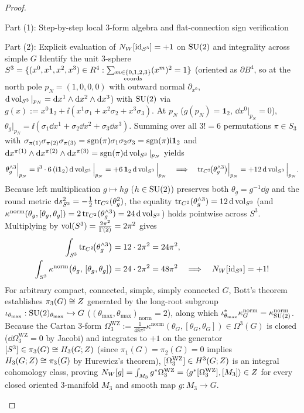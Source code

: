 \begin{proof}
\begin{proofpart}{Part (1): Step-by-step local $3$-form algebra and flat-connection sign verification}
\end{proofpart}
\begin{proofpart}{Part (2): Explicit evaluation of $N_W[\operatorname{id}_{S^3}] = +1$ on $\operatorname{SU}(2)$ and integrality across simple $G$}
Identify the unit $3$-sphere $S^3 = \{(x^0,x^1,x^2,x^3) \in R^4 : \sum_{\substack{m\in\{0,1,2,3\}\\\mathrm{coords}}}(x^m)^2 = 1\}$ (oriented as $\partial B^4$, so at the north pole $p_N = (1,0,0,0)$ with outward normal $\partial_{x^0}$, $\mathrm{d}\operatorname{vol}_{S^3}|_{p_N} = \mathrm{d} x^1\wedge\mathrm{d} x^2\wedge\mathrm{d} x^3$) with $\operatorname{SU}(2)$ via $g(x) := x^0\mathbf{1}_2 + \ii(x^1\sigma_1 + x^2\sigma_2 + x^3\sigma_3)$. At $p_N$ ($g(p_N)=\mathbf{1}_2$, $\dd x^0|_{p_N}=0$), $\theta_g|_{p_N} = \ii(\sigma_1\dd x^1 + \sigma_2\dd x^2 + \sigma_3\dd x^3)$. Summing over all $3! = 6$ permutations $\pi \in S_3$ with $\sigma_{\pi(1)}\sigma_{\pi(2)}\sigma_{\pi(3)} = \operatorname{sgn}(\pi)\sigma_1\sigma_2\sigma_3 = \operatorname{sgn}(\pi)\mathrm{i}\mathbf{1}_2$ and $\mathrm{d} x^{\pi(1)}\wedge\mathrm{d} x^{\pi(2)}\wedge\mathrm{d} x^{\pi(3)} = \operatorname{sgn}(\pi)\mathrm{d}\operatorname{vol}_{S^3}|_{p_N}$ yields
\[
\theta_g^{\wedge 3}\Big|_{p_N} = \mathrm{i}^3\cdot 6\,(\mathrm{i}\mathbf{1}_2)\,\mathrm{d}\operatorname{vol}_{S^3}\Big|_{p_N} = +6\,\mathbf{1}_2\,\mathrm{d}\operatorname{vol}_{S^3}\Big|_{p_N}\quad\Longrightarrow\quad
\operatorname{tr}_{C^2}\!\bigl(\theta_g^{\wedge 3}\bigr)\Big|_{p_N} = +12\,\mathrm{d}\operatorname{vol}_{S^3}\Big|_{p_N}.
\]
Because left multiplication $g \mapsto h g$ ($h \in \operatorname{SU}(2)$) preserves both $\theta_g = g^{-1}\dd g$ and the round metric $\mathrm{d} s^2_{S^3} = -\frac{1}{2}\operatorname{tr}_{C^2}(\theta_g^2)$, the equality $\operatorname{tr}_{C^2}(\theta_g^{\wedge 3}) = 12\,\mathrm{d}\operatorname{vol}_{S^3}$ (and $\kappa^{\mathrm{norm}}(\theta_g,[\theta_g,\theta_g]) = 2\operatorname{tr}_{C^2}(\theta_g^{\wedge 3}) = 24\,\mathrm{d}\operatorname{vol}_{S^3}$) holds pointwise across $S^3$. Multiplying by $\operatorname{vol}(S^3) = \frac{2\pi^2}{\Gamma(2)} = 2\pi^2$ gives
\[
\begin{aligned}
\int_{S^3}\operatorname{tr}_{C^2}\!\bigl(\theta_g^{\wedge 3}\bigr) &= 12\cdot 2\pi^2 = 24\pi^2,\\
\int_{S^3}\kappa^{\mathrm{norm}}\bigl(\theta_g,\, [\theta_g, \theta_g]\bigr) &= 24\cdot 2\pi^2 = 48\pi^2\quad\Longrightarrow\quad N_W[\operatorname{id}_{S^3}] = +1!
\end{aligned}
\]
For arbitrary compact, connected, simple, simply connected $G$, Bott's theorem~\cite{Bott59} establishes $\pi_3(G) \cong Z$ generated by the long-root subgroup $\iota_{\theta_{\max}} : \operatorname{SU}(2)_{\theta_{\max}} \hookrightarrow G$ ($(\theta_{\max},\theta_{\max})_{\mathrm{norm}} = 2$), along which $\iota_{\theta_{\max}}^*\kappa^{\mathrm{norm}}_G = \kappa^{\mathrm{norm}}_{\operatorname{SU}(2)}$. Because the Cartan $3$-form $\Omega_3^{\mathrm{WZ}} := \frac{1}{48\pi^2}\kappa^{\mathrm{norm}}(\theta_G,[\theta_G,\theta_G]) \in \Omega^3(G)$ is closed ($\dd\Omega_3^{\mathrm{WZ}} = 0$ by Jacobi) and integrates to $+1$ on the generator $[S^3] \in \pi_3(G) \cong H_3(G;Z)$ (since $\pi_1(G)=\pi_2(G)=0$ implies $H_3(G;Z) \cong \pi_3(G)$ by Hurewicz's theorem), $[\Omega_3^{\mathrm{WZ}}] \in H^3(G;Z)$ is an integral cohomology class, proving $N_W[g] = \int_{M_3}g^*\Omega_3^{\mathrm{WZ}} = \langle g^*[\Omega_3^{\mathrm{WZ}}], [M_3]\rangle \in Z$ for every closed oriented $3$-manifold $M_3$ and smooth map $g : M_3 \to G$.

\end{proofpart}
\end{proof}
